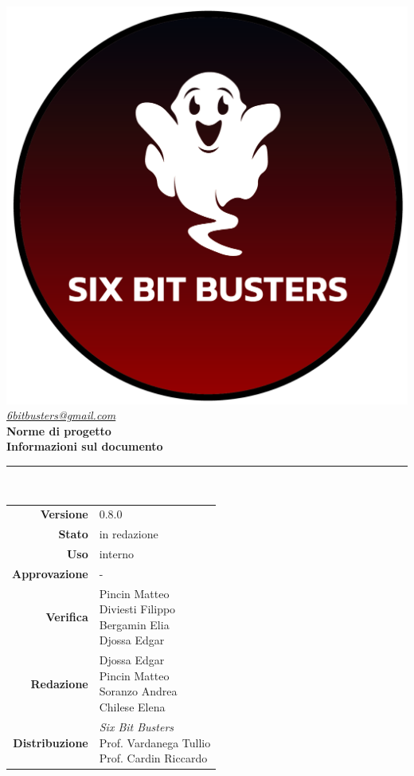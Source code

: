 \thispagestyle{empty}
\renewcommand{\arraystretch}{1.3}


\begin{titlepage}
	\begin{center}
		
	\includegraphics[scale = 0.7]{template/images/logo-circle.png}
	\\[1cm]
	\href{mailto:6bitbusters@gmail.com}		      	
	{\large{\textit{6bitbusters@gmail.com} } }\\[1cm]
	
	\Huge \textbf{Norme di progetto} \\[1cm]

	\large \textbf{Informazioni sul documento} \\
	\rule{0.6\textwidth}{0.4pt}
	\\[0.5cm]
	\begin{tabular}{r|l}
		\textbf{Versione} & 0.8.0\\
		\textbf{Stato} & in redazione\\
		\textbf{Uso} & interno\\                         
		\textbf{Approvazione} & -\\                      
		\textbf{Verifica} & \parbox[t]{5cm}{Pincin Matteo\\ Diviesti Filippo\\ Bergamin Elia\\ Djossa Edgar}\\                        
		\textbf{Redazione} & \parbox[t]{5cm}{Djossa Edgar \\ Pincin Matteo \\ Soranzo Andrea\\ Chilese Elena}\\
		\textbf{Distribuzione} & \parbox[t]{5cm}{ \textit{Six Bit Busters} \\ Prof. Vardanega Tullio 
	 \\ Prof. Cardin Riccardo}
	\end{tabular}	
	\\[1.2cm]


\end{center}
\end{titlepage}

